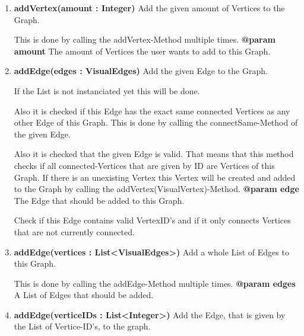 \documentclass{article}
\begin{document}
\begin{enumerate}
{\begin{enumerate}[+]
{						This is done by calling the addVertex-Method multiple times.
						\newline
						\textbf{@param vertices}
							The List of Vertices that should be added to the List.
							\newline
					}
					\item{
						\textbf{addVertex(amount : Integer)} \newline
						Add the given amount of Vertices to the Graph.
						
						This is done by calling the addVertex-Method multiple times.
						\newline
						\textbf{@param amount}
							The amount of Vertices the user wants to add to this Graph.
							\newline
					}
					\item{
						\textbf{addEdge(edges : VisualEdges)} \newline
						Add the given Edge to the Graph.
						
						If the List is not instanciated yet this will be done.
						
						Also it is checked if this Edge has the exact same connected Vertices as any other Edge of this Graph.
						This is done by calling the connectSame-Method of the given Edge.
						
						Also it is checked that the given Edge is valid.
						That means that this method checks if all connected-Vertices that are given by ID are Vertices of this Graph.
						If there is an unexisting Vertex this Vertex will be created and added to the Graph by calling the addVertex(VisualVertex)-Method.
						\newline
						\textbf{@param edge}
							The Edge that should be added to this Graph.
							
							Check if this Edge contains valid VertexID's and if it only connects Vertices that are not currently connected.
							\newline
					}
					\item{
						\textbf{addEdge(vertices : List<VisualEdges>)} \newline
						Add a whole List of Edges to this Graph.
						
						This is done by calling the addEdge-Method multiple times.
						\newline
						\textbf{@param edges}
							A List of Edges that should be added.
							\newline
					}
					\item{
						\textbf{addEdge(verticeIDs : List<Integer>)} \newline
						Add the Edge, that is given by the List of Vertice-ID's, to the graph.
						
}
\end{enumerate}}
\end{enumerate}
\end{document}
